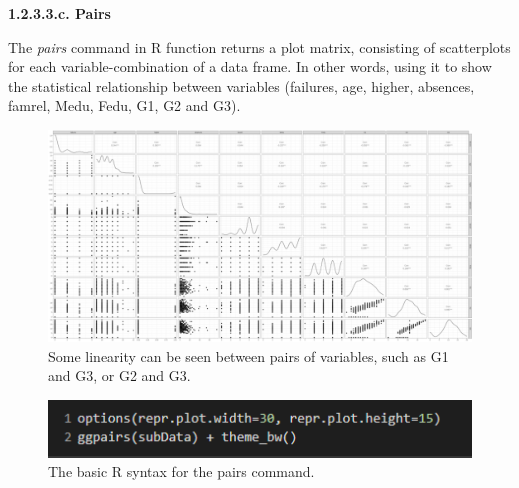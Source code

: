 \documentclass[a4paper]{article}
\begin{document}

\textbf{1.2.3.3.c. Pairs \\ \newline}
The \textit{pairs} command in R function returns a plot matrix, consisting of scatterplots for each variable-combination of a data frame. In other words, using it to show the statistical relationship between variables (failures, age, higher, absences, famrel, Medu, Fedu, G1, G2 and G3).
\begin{figure}[H]
    \centering
    \includegraphics[scale = 0.8]{Images/42.PNG}
    \caption{Some linearity can be seen between pairs of variables, such as G1 and G3, or G2 and G3.}
    \label{fig:pairs2}
\end{figure}
\begin{figure}[H]
    \centering
    \includegraphics[scale = 1.5]{Images/41.PNG}
    \caption{The basic R syntax for the pairs command.}
    \label{fig:pairs1}
\end{figure}

\end{document}
